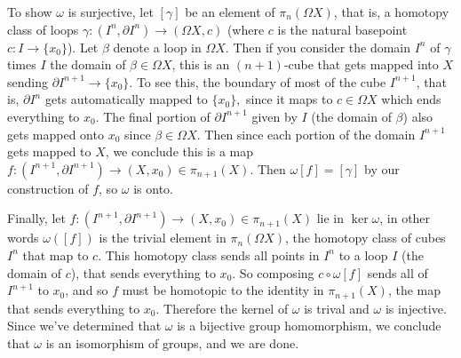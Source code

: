 \begin{solution}
    To show $\omega $ is surjective, let $[\gamma]$ be an element of $\pi_n (\Omega X)$, that is, a homotopy class of loops $\gamma \colon (I^n , \partial  I^n ) \to (\Omega X, c)$ (where $c$ is the natural basepoint $c \colon  I \to \{x_0\} $). Let $\beta $ denote a loop in $\Omega X$. Then if you consider the domain $I^n $ of $\gamma$ times $I$ the domain of $\beta \in \Omega X$, this is an $(n+1)$-cube that gets mapped into $X$ sending $\partial I^{n+1}\to \{x_0\} $. To see this, the boundary of most of the cube $I^{n+1}$, that is, $\partial  I^n $ gets automatically mapped to $\{x_0\} ,$ since it maps to $c\in \Omega X$ which ends everything to $x_0$. The final portion of $\partial I^{n+1}$ given by $I$ (the domain of $\beta $) also gets mapped onto $x_0$ since $\beta \in \Omega X$. Then since each portion of the domain $I^{n+1}$ gets mapped to $X$, we conclude this is a map $f \colon (I^{n+1}, \partial I^{n+1}) \to (X, x_0)\in \pi_{n+1}(X)$. Then $\omega[f]=[\gamma]$ by our construction of $f$, so $\omega$ is onto.

    Finally, let $f \colon (I^{n+1}, \partial I^{n+1}) \to (X,x_0)\in \pi_{n+1}(X)$ lie in $\ker \omega$, in other words $\omega ([f])$ is the trivial element in $\pi_n (\Omega X)$, the homotopy class of cubes $I^n $ that map to $c$. This homotopy class sends all points in $I^n $ to a loop $I$ (the domain of $c$), that sends everything to $x_0$. So composing $c\circ \omega[f]$ sends all of $I^{n+1}$ to $x_0$, and so $f$ must be homotopic to the identity in $\pi_{n+1}(X)$, the map that sends everything to $x_0$. Therefore the kernel of $\omega$ is trival and $\omega$ is injective. Since we've determined that $\omega$ is a bijective group homomorphism, we conclude that $\omega$ is an isomorphism of groups, and we are done.
\end{solution}
